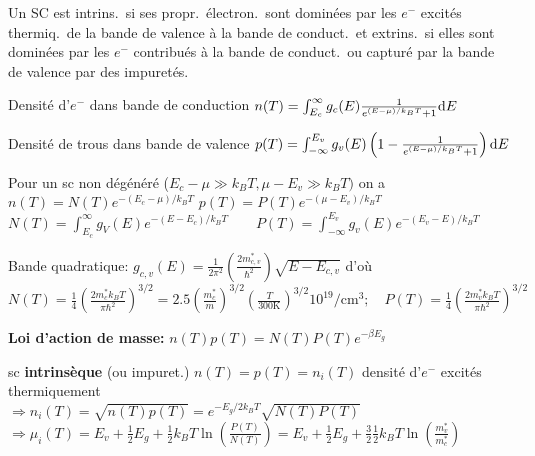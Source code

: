 Un SC est intrins.\ si ses propr.\ électron.\ sont dominées par les $e^-$ excités thermiq.\ de la bande de valence à la bande de conduct.\ et extrins.\ si elles sont dominées par les $e^-$ contribués à la bande de conduct.\ ou capturé par la bande de valence par des impuretés.
\begin{squishlist}
    \item Densité d'$e^-$ dans bande de conduction $n(T) = \int_{E_c}^{\infty} g_c(E) \frac{1}{e^{(E-\mu)/k_B T} + 1} \textrm{d} E$
    \item Densité de trous dans bande de valence $p(T) =\int_{-\infty}^{E_v} g_v(E)\left( 1- \frac{1}{e^{(E-\mu)/k_B T} + 1} \right)\textrm{d} E$
    \item Pour un sc non dégénéré ($E_c - \mu \gg k_B T, \mu -E_v \gg k_B T)$ on a \\ $n(T) = N(T) e^{-(E_c - \mu) / k_B T}$ \qquad $p(T) = P(T) e^{-(\mu - E_v) / k_B T}$ \vspace{0.05cm} \\
    $N(T) = \int_{E_c}^{\infty} g_V(E) e^{-(E-E_c)/k_B T} \qquad P(T) = \int_{-\infty}^{E_v}g_v(E) e^{-(E_v - E)/ k_B T}$
    \item Bande quadratique: $g_{c,v}(E) = \frac{1}{2 \pi^2}\left( \frac{2m^*_{c,v}}{\hbar^2}\right) \sqrt{E - E_{c,v}}$
    d'où \\
    $N(T) = \frac{1}{4} \left( \frac{2 m_c^* k_B T}{\pi \hbar^2}\right)^{3/2}=2.5 \left(\frac{m_c^*}{m}\right)^{3/2} \left(\frac{T}{300 \mathrm{K}}\right)^{3/2} 10^{19}/\mathrm{cm}^3; \quad P(T) = \frac{1}{4} \left( \frac{2 m_v^* k_B T}{\pi \hbar^2}\right)^{3/2}$
    \item \textbf{Loi d'action de masse:} $n(T)p(T) = N(T)P(T) e^{-\beta E_g}$
    \item sc \textbf{intrinsèque} (ou impuret.) $n(T) = p(T) = n_i(T)$ \quad densité d'$e^-$ excités thermiquement \\
    $\Longrightarrow n_i(T) = \sqrt{n(T) p(T)} = e^{-E_g / 2 k_B T} \sqrt{N(T) P(T)}$ \\
    $\Longrightarrow \mu_i(T) = E_v + \frac{1}{2}E_g + \frac{1}{2}k_B T \ln \left( \frac{P(T)}{N(T)}\right) = E_v + \frac{1}{2}E_g + \frac{3}{2}\frac{1}{2}k_B T \ln \left( \frac{m_v^*}{m_c^*}\right)$
\end{squishlist}

